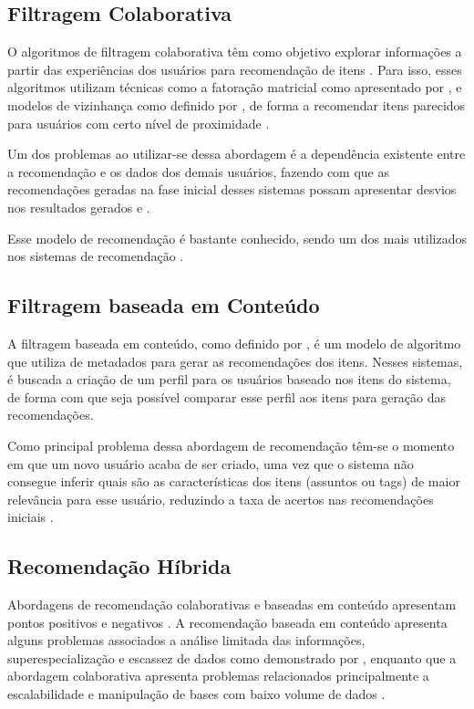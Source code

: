 \subsection{Filtragem Colaborativa}

O algoritmos de filtragem colaborativa têm como objetivo explorar informações a partir das experiências dos usuários para recomendação de itens \cite{sedhain2015}. Para isso, esses algoritmos utilizam técnicas como a fatoração matricial como apresentado por ,  e modelos de vizinhança como definido por , de forma a recomendar itens parecidos para usuários com certo nível de proximidade \cite{kimfalk2019}.

Um dos problemas ao utilizar-se dessa abordagem é a dependência existente entre a recomendação e os dados dos demais usuários, fazendo com que as recomendações geradas na fase inicial desses sistemas possam apresentar desvios nos resultados gerados  e \cite{choi2010content}.

Esse modelo de recomendação é bastante conhecido, sendo um dos mais utilizados nos sistemas de recomendação \cite{alyari2018}.

\subsection{Filtragem baseada em Conteúdo}

A filtragem baseada em conteúdo, como definido por , é um modelo de algoritmo que utiliza de metadados para gerar as recomendações dos itens. Nesses sistemas, é buscada a criação de um perfil para os usuários baseado nos itens do sistema, de forma com que seja possível comparar esse perfil aos itens para geração das recomendações.

Como principal problema dessa abordagem de recomendação têm-se o momento em que um novo usuário acaba de ser criado, uma vez que o sistema não consegue inferir quais são as características dos itens (assuntos ou tags) de maior relevância para esse usuário, reduzindo a taxa de acertos nas recomendações iniciais \cite{inbook}.

\subsection{Recomendação Híbrida}

Abordagens de recomendação colaborativas e baseadas em conteúdo apresentam pontos positivos e negativos \cite{kimfalk2019}. A recomendação baseada em conteúdo apresenta alguns problemas associados a análise limitada das informações, superespecialização e escassez de dados como demonstrado por , enquanto que a abordagem colaborativa apresenta problemas relacionados principalmente a escalabilidade e manipulação de bases com baixo volume de dados \cite{isinkaye2015}.

